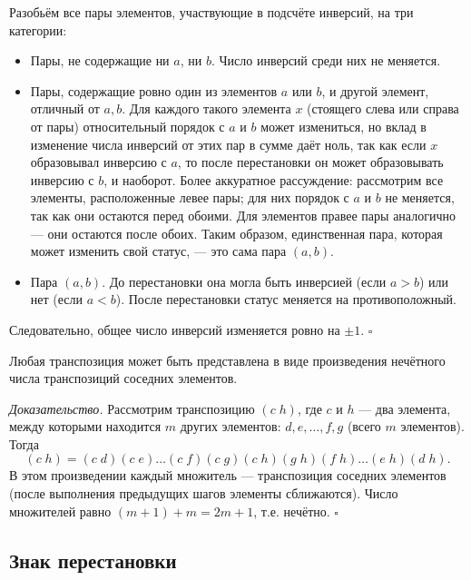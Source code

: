 \documentclass[a4paper,12pt]{article}
\theoremstyle{definition}
\theoremstyle{plain}
\theoremstyle{remark}
\begin{document}
	Разобьём все пары элементов, участвующие в подсчёте инверсий, на три категории:
	\begin{itemize}
		\item Пары, не содержащие ни \( a \), ни \( b \). Число инверсий среди них не меняется.
		\item Пары, содержащие ровно один из элементов \( a \) или \( b \), и другой элемент, отличный от \( a, b \). Для каждого такого элемента \( x \) (стоящего слева или справа от пары) относительный порядок с \( a \) и \( b \) может измениться, но вклад в изменение числа инверсий от этих пар в сумме даёт ноль, так как если \( x \) образовывал инверсию с \( a \), то после перестановки он может образовывать инверсию с \( b \), и наоборот. Более аккуратное рассуждение: рассмотрим все элементы, расположенные левее пары; для них порядок с \( a \) и \( b \) не меняется, так как они остаются перед обоими. Для элементов правее пары аналогично — они остаются после обоих. Таким образом, единственная пара, которая может изменить свой статус, — это сама пара \( (a, b) \).
		\item Пара \( (a, b) \). До перестановки она могла быть инверсией (если \( a > b \)) или нет (если \( a < b \)). После перестановки статус меняется на противоположный.
	\end{itemize}
	
	Следовательно, общее число инверсий изменяется ровно на \( \pm 1 \). \hfill \(\square\)
	
	\begin{tcolorbox}[colback=red!5, colframe=red!50!black, title=Лемма 2 (Произвольная транспозиция)]
		Любая транспозиция может быть представлена в виде произведения нечётного числа транспозиций соседних элементов.
	\end{tcolorbox}
	
	\medskip
	\textit{Доказательство.}
	Рассмотрим транспозицию \( (c \; h) \), где \( c \) и \( h \) — два элемента, между которыми находится \( m \) других элементов: \( d, e, \dots, f, g \) (всего \( m \) элементов). Тогда
	\[
	(c \; h) = (c \; d)(c \; e)\dots(c \; f)(c \; g)(c \; h)(g \; h)(f \; h)\dots(e \; h)(d \; h).
	\]
	В этом произведении каждый множитель — транспозиция соседних элементов (после выполнения предыдущих шагов элементы сближаются). Число множителей равно \( (m+1) + m = 2m + 1 \), т.е. нечётно. \hfill \(\square\)
	
	\subsection{Знак перестановки}
	
\end{document}
